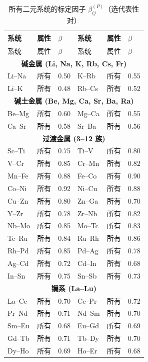 \documentclass[12pt,a4paper]{article}
\begin{document}
	\begin{longtable}{p{1.5cm}p{1.5cm}p{1.2cm}p{1.2cm}p{1.2cm}p{1.2cm}}
		\caption{所有二元系统的标定因子 \(\beta_{ij}^{(P)}\)（选代表性对）} \label{tab:beta-full} \\
		\toprule
		系统 & 属性 & \(\beta\) & 系统 & 属性 & \(\beta\) \\
		\midrule
		\endfirsthead
		\toprule
		系统 & 属性 & \(\beta\) & 系统 & 属性 & \(\beta\) \\
		\midrule
		\endhead
		\multicolumn{6}{c}{\textbf{碱金属 (Li, Na, K, Rb, Cs, Fr)}} \\
		Li–Na & 所有 & 0.50 & K–Rb & 所有 & 0.55 \\
		Li–K  & 所有 & 0.48 & Rb–Cs & 所有 & 0.52 \\
		\multicolumn{6}{c}{\textbf{碱土金属 (Be, Mg, Ca, Sr, Ba, Ra)}} \\
		Be–Mg & 所有 & 0.60 & Mg–Ca & 所有 & 0.55 \\
		Ca–Sr & 所有 & 0.58 & Sr–Ba & 所有 & 0.56 \\
		\multicolumn{6}{c}{\textbf{过渡金属 (3–12 族)}} \\
		Sc–Ti & 所有 & 0.75 & Ti–V & 所有 & 0.80 \\
		V–Cr  & 所有 & 0.85 & Cr–Mn & 所有 & 0.82 \\
		Mn–Fe & 所有 & 0.88 & Fe–Co & 所有 & 0.90 \\
		Co–Ni & 所有 & 0.92 & Ni–Cu & 所有 & 0.88 \\
		Cu–Zn & 所有 & 0.80 & Zn–Ga & 所有 & 0.70 \\
		Y–Zr  & 所有 & 0.78 & Zr–Nb & 所有 & 0.82 \\
		Nb–Mo & 所有 & 0.85 & Mo–Tc & 所有 & 0.83 \\
		Tc–Ru & 所有 & 0.84 & Ru–Rh & 所有 & 0.86 \\
		Rh–Pd & 所有 & 0.85 & Pd–Ag & 所有 & 0.78 \\
		Ag–Cd & 所有 & 0.72 & Cd–In & 所有 & 0.68 \\
		In–Sn & 所有 & 0.75 & Sn–Sb & 所有 & 0.73 \\
		\multicolumn{6}{c}{\textbf{镧系 (La–Lu)}} \\
		La–Ce & 所有 & 0.70 & Ce–Pr & 所有 & 0.72 \\
		Pr–Nd & 所有 & 0.71 & Nd–Sm & 所有 & 0.70 \\
		Sm–Eu & 所有 & 0.68 & Eu–Gd & 所有 & 0.69 \\
		Gd–Tb & 所有 & 0.71 & Tb–Dy & 所有 & 0.70 \\
		Dy–Ho & 所有 & 0.69 & Ho–Er & 所有 & 0.68 \\

\end{longtable}
\end{document}

